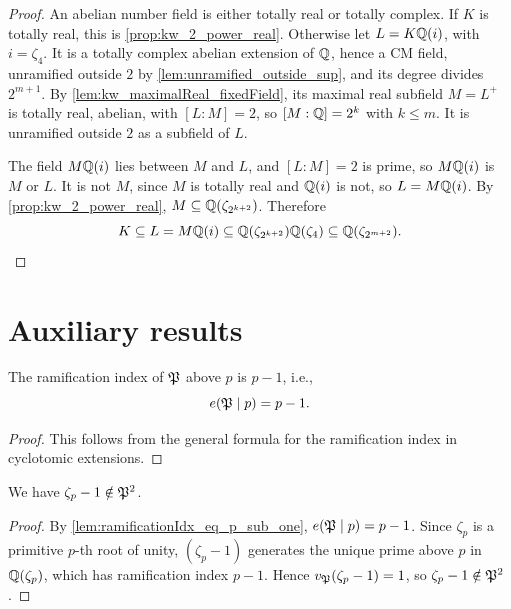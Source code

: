 \begin{proof}
  \leanok
  An abelian number field is either totally real or totally complex. If $K$ is totally real, this
  is \ref{prop:kw_2_power_real}. Otherwise let $L = K\mathbb{Q}(i)$, with $i = \zeta_4$. It is a totally
  complex abelian extension of $\mathbb{Q}$, hence a CM field, unramified outside $2$ by
  \ref{lem:unramified_outside_sup}, and its degree divides $2^{m+1}$. By
  \ref{lem:kw_maximalReal_fixedField}, its maximal real subfield $M = L^+$ is totally real, abelian,
  with $[L:M] = 2$, so $[M:\mathbb{Q}] = 2^k$ with $k \leq m$. It is unramified outside $2$ as a subfield
  of $L$.

  The field $M\mathbb{Q}(i)$ lies between $M$ and $L$, and $[L:M] = 2$ is prime, so $M\mathbb{Q}(i)$ is $M$ or
  $L$. It is not $M$, since $M$ is totally real and $\mathbb{Q}(i)$ is not, so $L = M\mathbb{Q}(i)$. By
  \ref{prop:kw_2_power_real}, $M \subseteq \mathbb{Q}(\zeta_{2^{k+2}})$. Therefore
  \[
    K \subseteq L = M\mathbb{Q}(i) \subseteq \mathbb{Q}(\zeta_{2^{k+2}})\mathbb{Q}(\zeta_4)
      \subseteq \mathbb{Q}(\zeta_{2^{m+2}}).
  \]
\end{proof}

\chapter{Auxiliary results}

\begin{lemma}
  \label{lem:ramificationIdx_eq_p_sub_one}
  \leanok
  The ramification index of $\mathfrak{P}$ above $p$ is $p - 1$, i.e.,
  \[
    e(\mathfrak{P} \mid p) = p - 1.
  \]
\end{lemma}

\begin{proof}
  \leanok
  This follows from the general formula for the ramification index
  in cyclotomic extensions.
\end{proof}

\begin{lemma}
  \label{lem:zeta_sub_one_not_mem_sq}
  \leanok
  We have $\zeta_p - 1 \notin \mathfrak{P}^2$.
\end{lemma}

\begin{proof}
  \leanok
  By \ref{lem:ramificationIdx_eq_p_sub_one}, $e(\mathfrak{P} \mid p) = p - 1$. Since $\zeta_p$ is a
  primitive $p$-th root of unity, $(\zeta_p - 1)$ generates the unique prime
  above $p$ in $\mathbb{Q}(\zeta_p)$, which has ramification index $p - 1$. Hence
  $v_{\mathfrak{P}}(\zeta_p - 1) = 1$, so $\zeta_p - 1 \notin \mathfrak{P}^2$.
\end{proof}

